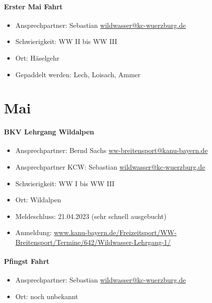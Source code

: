 \documentclass[12pt, a4paper]{report}
\begin{document}
\paragraph{Erster Mai Fahrt}
\begin{itemize}
    \item Ansprechpartner: Sebastian \href{mailto:wildwasser@kc-wuerzburg.de}{wildwasser@kc-wuerzburg.de}
    \item Schwierigkeit: WW II bis WW III
    \item Ort: Häselgehr
    \item Gepaddelt werden: Lech, Loisach, Ammer
\end{itemize}

\section*{Mai}\paragraph{BKV Lehrgang Wildalpen}
\begin{itemize}
    \item Ansprechpartner: Bernd Sachs \href{mailto:ww-breitensport@kanu-bayern.de}{ww-breitensport@kanu-bayern.de}
    \item Ansprechpartner KCW: Sebastian \href{mailto:wildwasser@kc-wuerzburg.de}{wildwasser@kc-wuerzburg.de}
    \item Schwierigkeit: WW I bis WW III
    \item Ort: Wildalpen
    \item Meldeschluss: 21.04.2023 (sehr schnell ausgebucht)
    \item Anmeldung: \url{www.kanu-bayern.de/Freizeitsport/WW-Breitensport/Termine/642/Wildwasser-Lehrgang-1/}
\end{itemize}

\paragraph{Pfingst Fahrt}
\begin{itemize}
    \item Ansprechpartner: Sebastian \href{mailto:wildwasser@kc-wuerzburg.de}{wildwasser@kc-wuerzburg.de}
    \item Ort: noch unbekannt
\end{itemize}
\end{document}
